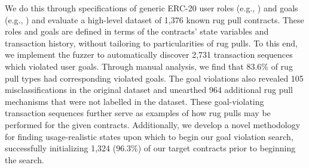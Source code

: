 We do this through specifications of generic ERC-20 user roles (e.g., \holder) and goals (e.g., \maxowned) and evaluate a high-level dataset of 1,376 known rug pull contracts.
These roles and goals are defined in terms of the contracts' state variables and transaction history, without tailoring to particularities of rug pulls.
To this end, we implement the \spoilsport fuzzer to automatically discover 2,731 transaction sequences which violated user goals.
Through manual analysis, we find that 83.6\% of rug pull types had corresponding violated goals.
The goal violations also revealed 105 misclassifications in the original dataset and unearthed 964 additional rug pull mechanisms that were not labelled in the dataset.
These goal-violating transaction sequences further serve as examples of how rug pulls may be performed for the given contracts.
Additionally, we develop a novel methodology for finding usage-realistic states upon which to begin our goal violation search, successfully initializing 1,324 (96.3\%) of our target contracts prior to beginning the search.
